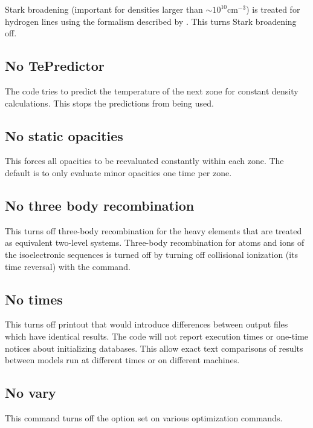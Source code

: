 Stark broadening (important for densities larger than
$\sim 10^{10}\mathrm{cm}^{-3}$) is
treated for hydrogen lines using the formalism described by
\citet{Puetter1981}.
This turns Stark broadening off.

\subsection{No TePredictor}

The code tries to predict the temperature of the next zone for constant
density calculations.
This stops the predictions from being used.

\subsection{No static opacities}

This forces all opacities to be reevaluated constantly within each zone.
The default is to only evaluate minor opacities one time per zone.

\subsection{No three body recombination}

This turns off three-body recombination for the heavy elements that are
treated as equivalent two-level systems.
Three-body recombination for atoms
and ions of the isoelectronic sequences is turned off by turning off
collisional ionization (its time reversal) with the
 command.

\subsection{No times}

This turns off printout that would introduce differences between 
output files which have identical results.
The code will not report execution times or one-time notices about initializing databases. 
This allow exact text comparisons of results between models run at
different times or on different machines.


\subsection{No vary}

This command turns off the  option set on
various optimization commands.

